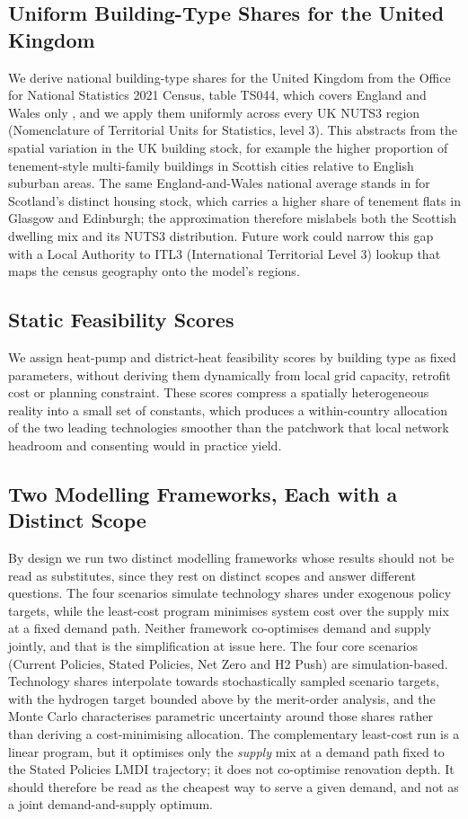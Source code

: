 \subsection{Uniform Building-Type Shares for the United Kingdom}
We derive national building-type shares for the United Kingdom from the
Office for National Statistics 2021 Census, table TS044, which covers England
and Wales only \citep{ONS2021TS044}, and we apply them uniformly across every UK
NUTS3 region (Nomenclature of Territorial Units for Statistics, level 3). This
abstracts from the spatial variation in the UK building stock, for example the
higher proportion of tenement-style multi-family buildings in Scottish cities
relative to English suburban areas. The same England-and-Wales national average
stands in for Scotland's distinct housing stock, which carries a higher share of
tenement flats in Glasgow and Edinburgh; the approximation therefore mislabels
both the Scottish dwelling mix and its NUTS3 distribution. Future work could
narrow this gap with a Local Authority to ITL3 (International Territorial Level
3) lookup that maps the census geography onto the model's regions.

\subsection{Static Feasibility Scores}
We assign heat-pump and district-heat feasibility scores by building type as fixed parameters, without deriving them dynamically from local grid capacity,
retrofit cost or planning constraint. These scores compress a spatially
heterogeneous reality into a small set of constants, which produces a
within-country allocation of the two leading technologies smoother than the
patchwork that local network headroom and consenting would in practice yield.

\subsection{Two Modelling Frameworks, Each with a Distinct Scope}
By design we run two distinct modelling frameworks whose results should not be
read as substitutes, since they rest on distinct scopes and answer different
questions. The four scenarios simulate technology shares under exogenous policy targets, while the least-cost program minimises system cost over the supply mix at a fixed demand path. Neither framework co-optimises demand and supply jointly, and
that is the simplification at issue here. The four core scenarios (Current
Policies, Stated Policies, Net Zero and H2 Push) are simulation-based. Technology
shares interpolate towards stochastically sampled scenario targets, with the
hydrogen target bounded above by the merit-order analysis, and
the Monte Carlo characterises parametric uncertainty around those shares rather
than deriving a cost-minimising allocation. The complementary least-cost
run is a linear program, but it optimises only the \emph{supply} mix
at a demand path fixed to the Stated Policies LMDI trajectory; it does not
co-optimise renovation depth. It should therefore be read as the cheapest way to serve a given demand, and not as a joint demand-and-supply optimum.

